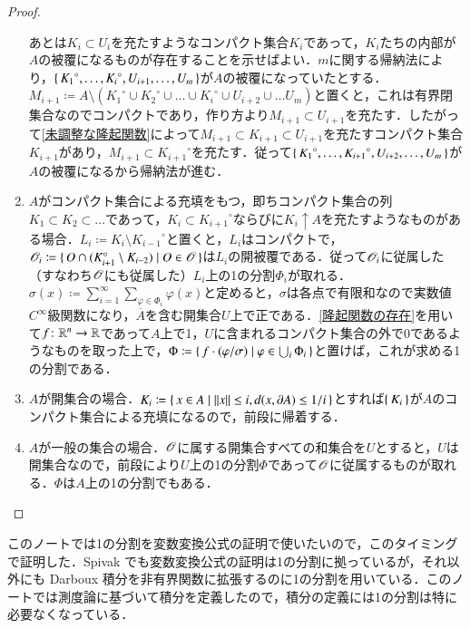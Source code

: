 \begin{proof}
\begin{enumerate}
あとは$K_i \subset U_i$を充たすようなコンパクト集合$K_i$であって，$K_i$たちの内部が$A$の被覆になるものが存在することを示せばよい．$m$に関する帰納法により，$\set{{K_1}^\circ,\dots, {K_i}^\circ, U_{i+1}, \dots, {U_m}}$が$A$の被覆になっていたとする．$M_{i+1} \coloneqq A \setminus ({K_1}^\circ \cup {K_2}^\circ \cup \dots \cup {K_i}^\circ \cup U_{i+2} \cup \dots U_m)$と置くと，これは有界閉集合なのでコンパクトであり，作り方より$M_{i+1} \subset U_{i+1}$を充たす．したがって\cref{未調整な隆起関数}によって$M_{i+1} \subset K_{i+1} \subset U_{i+1}$を充たすコンパクト集合$K_{i+1}$があり，$M_{i+1} \subset {K_{i+1}}^\circ$を充たす．従って$\set{{K_1}^\circ,\dots, {K_{i+1}}^\circ, U_{i+2}, \dots, {U_m}}$が$A$の被覆になるから帰納法が進む．
\item $A$がコンパクト集合による充填をもつ，即ちコンパクト集合の列$K_1 \subset K_2 \subset \dots $であって，$K_i \subset {K_{i+1}}^\circ$ならびに$K_i \uparrow A$を充たすようなものがある場合．$L_i \coloneqq K_{i} \setminus {K_{i-1}}^\circ$と置くと，$L_i$はコンパクトで，$\mathscr{O}_i \coloneqq \set{ O \cap (K_{i+1}^\circ \setminus K_{i-2} ) |  O \in \mathscr{O}}$は$L_i$の開被覆である．従って$\mathscr{O}_i$に従属した（すなわち$\mathscr{O}$にも従属した）$L_i$上の1の分割$\Phi_i$が取れる．$\sigma(x) \coloneqq \sum_{i=1}^\infty \sum_{\varphi \in \Phi_i} \varphi(x)$と定めると，$\sigma$は各点で有限和なので実数値$C^\infty$級関数になり，$\overline{A}$を含む開集合$U$上で正である．\cref{隆起関数の存在}を用いて$f \colon \mathbb{R}^n \to \mathbb{R}$であって$A$上で1，$U$に含まれるコンパクト集合の外で0であるようなものを取った上で，$\Phi \coloneqq \set{ f \cdot  (\varphi / \sigma) | \varphi \in \bigcup_i \Phi_i }$と置けば，これが求める1の分割である．
\item $A$が開集合の場合．$K_i \coloneqq \set{ x \in A | \|x\| \leq i, d(x, \partial A) \leq 1/i }$とすれば$\set{K_i}$が$A$のコンパクト集合による充填になるので，前段に帰着する．
\item $A$が一般の集合の場合．$\mathscr{O}$に属する開集合すべての和集合を$U$とすると，$U$は開集合なので，前段により$U$上の1の分割$\Phi$であって$\mathscr{O}$に従属するものが取れる．$\Phi$は$A$上の1の分割でもある．
\end{enumerate}
\end{proof}

\begin{dig}
このノートでは1の分割を変数変換公式の証明で使いたいので，このタイミングで証明した．Spivak でも変数変換公式の証明は1の分割に拠っているが，それ以外にも Darboux 積分を非有界関数に拡張するのに1の分割を用いている．このノートでは測度論に基づいて積分を定義したので，積分の定義には1の分割は特に必要なくなっている．
\end{dig}

